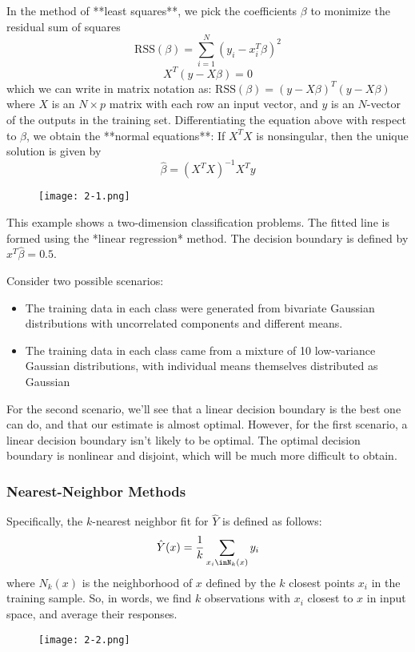 In the method of **least squares**, we pick the coefficients $\beta$ to monimize the residual sum of squares
\[
	\text{RSS}(\beta) = \sum_{i=1}^{N}(y_i - x_i^T\beta)^2
\]
\[
	X^T(y-X\beta) = 0
\]
which we can write in matrix notation as: $\text{RSS}(\beta) = (y - X\beta)^T(y-X\beta)$ where $X$ is an $N \times p$ matrix with each row an input vector, and $y$ is an $N$-vector of the outputs in the training set. Differentiating the equation above with respect to $\beta$, we obtain the **normal equations**:
If $X^TX$ is nonsingular, then the unique solution is given by
\[
	\hat{\beta} = (X^TX)^{-1}X^Ty
\]
\begin{wrapfigure}{l}{0.25\textwidth}
	\centering
	\texttt{[image: 2-1.png]}
	\caption{}
\end{wrapfigure}
This example shows a two-dimension classification problems. The fitted line is formed using the *linear regression* method. The decision boundary is defined by $x^T\hat{\beta} = 0.5$.

Consider two possible scenarios:
\begin{itemize}
	\item The training data in each class were generated from bivariate Gaussian distributions with uncorrelated components and different means.
	\item The training data in each class came from a mixture of 10 low-variance Gaussian distributions, with individual means themselves distributed as Gaussian
\end{itemize}
For the second scenario, we'll see that a linear decision boundary is the best one can do, and that our estimate is almost optimal. However, for the first scenario, a linear decision boundary isn't likely to be optimal. The optimal decision boundary is nonlinear and disjoint, which will be much more difficult to obtain.

\subsubsection{Nearest-Neighbor Methods}
Specifically, the $k$-nearest neighbor fit for $\hat{Y}$ is defined as follows:
\[
	\hat{Y}(x) = \frac{1}{k}\sum_{x_i\inN_k(x)}y_i
\]
where $N_k(x)$ is the neighborhood of $x$ defined by the $k$ closest points $x_i$ in the training sample. So, in words, we find $k$ observations with $x_i$ closest to $x$ in input space, and average their responses. \\

\begin{wrapfigure}{l}{0.2\textwidth}
	\centering
	\texttt{[image: 2-2.png]}
	\caption{}
\end{wrapfigure}

